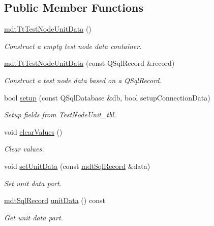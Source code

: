 \subsection*{Public Member Functions}
\begin{DoxyCompactItemize}
\item 
\hyperlink{classmdt_tt_test_node_unit_data_ab50920d5dc8058e41f79f5f0a72e1e3d}{mdt\-Tt\-Test\-Node\-Unit\-Data} ()
\begin{DoxyCompactList}\small\item\em Construct a empty test node data container. \end{DoxyCompactList}\item 
\hyperlink{classmdt_tt_test_node_unit_data_a149a8299df5a78daa85f49c680a41e21}{mdt\-Tt\-Test\-Node\-Unit\-Data} (const Q\-Sql\-Record \&record)
\begin{DoxyCompactList}\small\item\em Construct a test node data based on a Q\-Sql\-Record. \end{DoxyCompactList}\item 
bool \hyperlink{classmdt_tt_test_node_unit_data_ad918c34094027e4ea889454a9ffb7a8e}{setup} (const Q\-Sql\-Database \&db, bool setup\-Connection\-Data)
\begin{DoxyCompactList}\small\item\em Setup fields from Test\-Node\-Unit\-\_\-tbl. \end{DoxyCompactList}\item 
void \hyperlink{classmdt_tt_test_node_unit_data_a774da621d18566dcf42329664a356cad}{clear\-Values} ()
\begin{DoxyCompactList}\small\item\em Clear values. \end{DoxyCompactList}\item 
void \hyperlink{classmdt_tt_test_node_unit_data_a51e6a518bda41df4f4a68fee0fbff472}{set\-Unit\-Data} (const \hyperlink{classmdt_sql_record}{mdt\-Sql\-Record} \&data)
\begin{DoxyCompactList}\small\item\em Set unit data part. \end{DoxyCompactList}\item 
\hyperlink{classmdt_sql_record}{mdt\-Sql\-Record} \hyperlink{classmdt_tt_test_node_unit_data_afc769bf48aa7068a08b57330a509b566}{unit\-Data} () const 
\begin{DoxyCompactList}\small\item\em Get unit data part. \end{DoxyCompactList}\item 

\end{DoxyCompactItemize}
